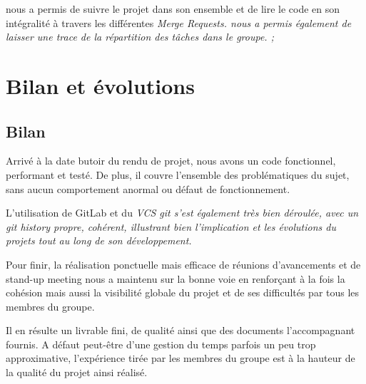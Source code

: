 \documentclass[a4paper, 12pt]{report}
\newcommand{\tech}[1]{\sf{#1}}
\newcommand{\gl}{\tech{GitLab}}
\newcommand{\en}[1]{\it{#1}}
\begin{document}
    \gl{} nous a permis de suivre le projet dans son ensemble et de lire le code en son intégralité à travers les différentes \en{Merge Request}s. \gl{} nous a permis également de laisser une trace de la répartition des tâches dans le groupe. ;

    
\part{Bilan et évolutions}
    
    \chapter{Bilan} %
    
    Arrivé à la date butoir du rendu de projet, nous avons un code fonctionnel, performant et testé. De plus, il couvre l'ensemble des problématiques du sujet, sans aucun comportement anormal ou défaut de fonctionnement.
    
    L'utilisation de GitLab et du \en{VCS} git s'est également très bien déroulée, avec un \en{git history} propre, cohérent, illustrant bien l'implication et les évolutions du projets tout au long de son développement.
    
    Pour finir, la réalisation ponctuelle mais efficace de réunions d'avancements et de stand-up meeting nous a maintenu sur la bonne voie en renforçant à la fois la cohésion mais aussi la visibilité globale du projet et de ses difficultés par tous les membres du groupe.
    
    Il en résulte un livrable fini, de qualité ainsi que des documents l'accompagnant fournis. A défaut peut-être d'une gestion du temps parfois un peu trop approximative, l'expérience tirée par les membres du groupe est à la hauteur de la qualité du projet ainsi réalisé.
    
    
\end{document}
